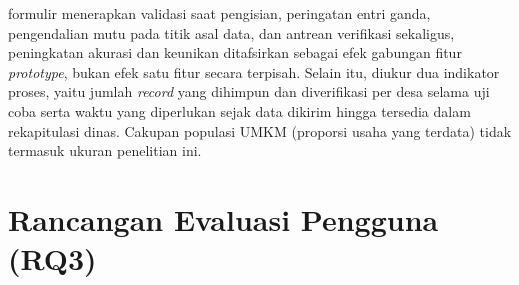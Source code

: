 formulir menerapkan validasi saat pengisian, peringatan entri ganda, pengendalian mutu pada titik asal data, dan antrean verifikasi sekaligus, peningkatan akurasi dan keunikan ditafsirkan sebagai efek gabungan fitur \textit{prototype}, bukan efek satu fitur secara terpisah. Selain itu, diukur dua indikator proses, yaitu jumlah \textit{record} yang dihimpun dan diverifikasi per desa selama uji coba serta waktu yang diperlukan sejak data dikirim hingga tersedia dalam rekapitulasi dinas. Cakupan populasi UMKM (proporsi usaha yang terdata) tidak termasuk ukuran penelitian ini.

\section{Rancangan Evaluasi Pengguna (RQ3)}
\label{sec:evalpengguna}

